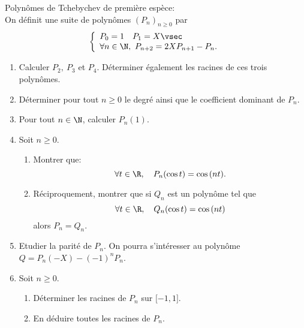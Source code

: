 \documentclass[a4paper, 11pt,reqno]{article}
\begin{document}
\begin{exercice} Polyn\^omes de Tchebychev de premi\`ere esp\`ece:\\
	\noindent On d\'efinit une suite de polyn\^omes $(P_n)_{n\geq 0}$ par
	$$\left\lbrace\begin{array}{l}
			P_0=1\quad P_1=X\vsec \\
			\forall n\in\N,\ P_{n+2}=2XP_{n+1}-P_n.
		\end{array}\right.$$
	\begin{enumerate}
		\item Calculer $P_2,\ P_3$ et $P_4$. D\'eterminer \'egalement les racines de ces trois polyn\^omes.
		\item D\'eterminer pour tout $n\geq 0$ le degr\'e ainsi que le coefficient dominant de $P_n$.
		\item Pour tout $n\in\N$, calculer $P_n(1)$.
		\item Soit $n\geq 0$.
		      \begin{enumerate}
			      \item Montrer que:
			            $$\forall t\in\R,\quad P_n(\cos{t})=\cos{(nt)}.$$
			      \item R\'eciproquement, montrer que si $Q_n$ est un polyn\^ome tel que
			            $$\forall t\in\R,\quad Q_n(\cos{t})=\cos{(nt)}$$
			            alors $P_n=Q_n$.
		      \end{enumerate}
		\item Etudier la parit\'e de $P_n$. On pourra s'int\'eresser au polyn\^ome $Q=P_n(-X)-(-1)^nP_n$.
		\item Soit $n\geq 0$.
		      \begin{enumerate}
			      \item D\'eterminer les racines de $P_n$ sur $\lbrack -1,1\rbrack$.
			      \item En d\'eduire toutes les racines de $P_n$.
		      \end{enumerate}
	\end{enumerate}
\end{exercice}
\end{document}
